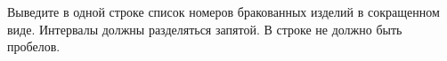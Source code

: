 Выведите в одной строке список номеров бракованных изделий в сокращенном виде. Интервалы должны разделяться запятой. В строке не должно быть пробелов.
